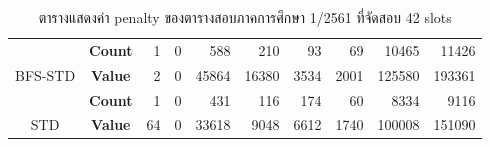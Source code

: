 \begin{table}[]
{\begin{tabular}{@{}ccrrrrrrrr@{}}
                                                 & \textbf{Count}                        & 1                         & 0                        & 588                          & 210                         & 93                          & 69                          & 10465                         & 11426                         \\ \cmidrule(l){2-10} 
    \multirow{-2}{*}{BFS-STD}                    & \textbf{Value}                        & 2                         & 0                        & 45864                        & 16380                       & 3534                        & 2001                        & 125580                        & 193361                        \\ \midrule
    {\color[HTML]{FE0000} }                      & {\color[HTML]{FE0000} \textbf{Count}} & {\color[HTML]{FE0000} 1}  & {\color[HTML]{FE0000} 0} & {\color[HTML]{FE0000} 431}   & {\color[HTML]{FE0000} 116}  & {\color[HTML]{FE0000} 174}  & {\color[HTML]{FE0000} 60}   & {\color[HTML]{FE0000} 8334}   & {\color[HTML]{FE0000} 9116}   \\ \cmidrule(l){2-10} 
    \multirow{-2}{*}{{\color[HTML]{FE0000} STD}} & {\color[HTML]{FE0000} \textbf{Value}} & {\color[HTML]{FE0000} 64} & {\color[HTML]{FE0000} 0} & {\color[HTML]{FE0000} 33618} & {\color[HTML]{FE0000} 9048} & {\color[HTML]{FE0000} 6612} & {\color[HTML]{FE0000} 1740} & {\color[HTML]{FE0000} 100008} & {\color[HTML]{FE0000} 151090} \\ \bottomrule
    \end{tabular}%
    }
    \caption{ตารางแสดงค่า penalty ของตารางสอบภาคการศึกษา 1/2561 ที่จัดสอบ 42 slots}
    \label{tab:result_table_161}
\end{table}
